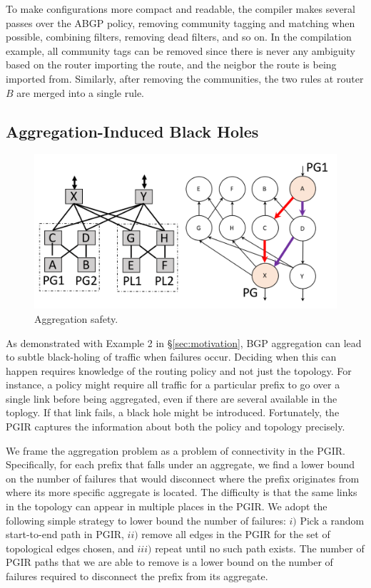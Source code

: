 To make configurations more compact and readable, the \sysname compiler makes several passes over the ABGP policy, removing community tagging and matching when possible, combining filters, removing dead filters, and so on. In the compilation example, all community tags can be removed since there is never any ambiguity based on the router importing the route, and the neigbor the route is being imported from. Similarly, after removing the communities, the two rules at router $B$ are merged into a single rule.

 

\subsection{Aggregation-Induced Black Holes}

\begin{figure}[t!]
\centering
\includegraphics[width=\columnwidth]{figures/aggregation}
\caption{Aggregation safety.}
\label{fig:aggregation-safety}
\end{figure}

As demonstrated with Example 2 in \S\ref{sec:motivation}, BGP aggregation can lead to subtle black-holing of traffic when failures occur. Deciding when this can happen requires knowledge of the routing policy and not just the topology. For instance, a policy might require all traffic for a particular prefix to go over a single link before being aggregated, even if there are several available in the toplogy. If that link fails, a black hole might be introduced. Fortunately, the PGIR captures the information about both the policy and topology precisely.

We frame the aggregation problem as a problem of connectivity in the PGIR. Specifically, for each prefix that falls under an aggregate, we find a lower bound on the number of failures that would disconnect where the prefix originates from where its more specific aggregate is located. The difficulty is that the same links in the topology can appear in multiple places in the PGIR. We adopt the following simple strategy to lower bound the number of failures: $i)$ Pick a random start-to-end path in PGIR, $ii)$ remove all edges in the PGIR for the set of topological edges chosen, and $iii)$ repeat until no such path exists.
The number of PGIR paths that we are able to remove is a lower bound on the number of failures required to disconnect the prefix from its aggregate. 

